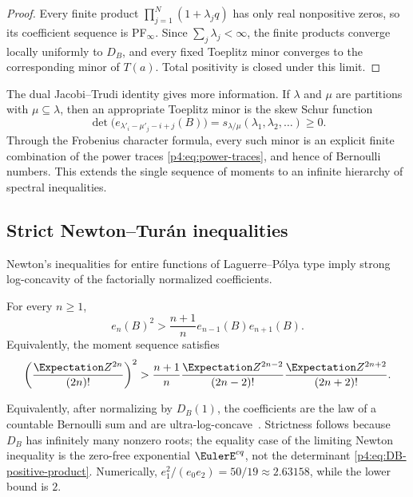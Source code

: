 \documentclass[11pt]{article}
\theoremstyle{definition}
\theoremstyle{remark}
\begin{document}
\begin{proof}
Every finite product \(\prod_{j=1}^{N}(1+\lambda_jq)\) has only real nonpositive
zeros, so its coefficient sequence is PF\(_\infty\).  Since
\(\sum_j\lambda_j<\infty\), the finite products converge locally uniformly to
\(D_B\), and every fixed Toeplitz minor converges to the corresponding minor of
\(T(a)\).  Total positivity is closed under this limit.
\end{proof}

The dual Jacobi--Trudi identity gives more information.  If \(\lambda\) and \(\mu\)
are partitions with \(\mu\subseteq\lambda\), then an appropriate Toeplitz minor is the
skew Schur function
\begin{equation}
 \det\bigl(e_{\lambda'_i-\mu'_j-i+j}(B)\bigr)
 =s_{\lambda/\mu}(\lambda_1,\lambda_2,\ldots)\ge0.
 \label{p4:eq:Schur-minors}
\end{equation}
Through the Frobenius character formula, every such minor is an explicit finite
combination of the power traces \eqref{p4:eq:power-traces}, and hence of Bernoulli
numbers.  This extends the single sequence of moments to an infinite hierarchy of
spectral inequalities.

\subsection{Strict Newton--Tur\'an inequalities}

Newton's inequalities for entire functions of Laguerre--P\'olya type imply strong
log-concavity of the factorially normalized coefficients.

\begin{corollary}
\label{p4:cor:Newton}
For every \(n\ge1\),
\begin{equation}
 \boxed{\quad
 e_n(B)^2>\frac{n+1}{n}e_{n-1}(B)e_{n+1}(B).
 \quad}
 \label{p4:eq:strict-Newton}
\end{equation}
Equivalently, the moment sequence satisfies
\begin{equation}
 \left(\frac{\Expectation Z^{2n}}{(2n)!}\right)^2
 >\frac{n+1}{n}
 \frac{\Expectation Z^{2n-2}}{(2n-2)!}
 \frac{\Expectation Z^{2n+2}}{(2n+2)!}.
 \label{p4:eq:moment-Turan}
\end{equation}
\end{corollary}

Equivalently, after normalizing by \(D_B(1)\), the coefficients are the law of a
countable Bernoulli sum and are ultra-log-concave~\cite{p4:Liggett1997}.
Strictness follows because \(D_B\) has infinitely many nonzero roots; the equality
case of the limiting Newton inequality is the zero-free exponential
\(\EulerE^{cq}\), not the determinant \eqref{p4:eq:DB-positive-product}.  Numerically,
\(e_1^2/(e_0e_2)=50/19\approx2.63158\), while the lower bound is \(2\).
\end{document}
